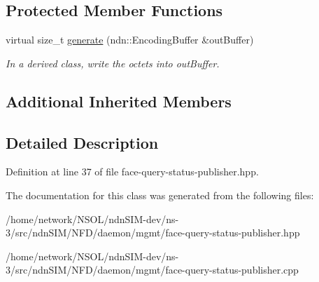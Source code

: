 \subsection*{Protected Member Functions}
\begin{DoxyCompactItemize}
\item 
virtual size\+\_\+t \hyperlink{classnfd_1_1FaceQueryStatusPublisher_a15087b46ee9720fafd8a7f6166cbb1b0}{generate} (ndn\+::\+Encoding\+Buffer \&out\+Buffer)\hypertarget{classnfd_1_1FaceQueryStatusPublisher_a15087b46ee9720fafd8a7f6166cbb1b0}{}\label{classnfd_1_1FaceQueryStatusPublisher_a15087b46ee9720fafd8a7f6166cbb1b0}

\begin{DoxyCompactList}\small\item\em In a derived class, write the octets into out\+Buffer. \end{DoxyCompactList}\end{DoxyCompactItemize}
\subsection*{Additional Inherited Members}


\subsection{Detailed Description}


Definition at line 37 of file face-\/query-\/status-\/publisher.\+hpp.



The documentation for this class was generated from the following files\+:\begin{DoxyCompactItemize}
\item 
/home/network/\+N\+S\+O\+L/ndn\+S\+I\+M-\/dev/ns-\/3/src/ndn\+S\+I\+M/\+N\+F\+D/daemon/mgmt/face-\/query-\/status-\/publisher.\+hpp\item 
/home/network/\+N\+S\+O\+L/ndn\+S\+I\+M-\/dev/ns-\/3/src/ndn\+S\+I\+M/\+N\+F\+D/daemon/mgmt/face-\/query-\/status-\/publisher.\+cpp\end{DoxyCompactItemize}

